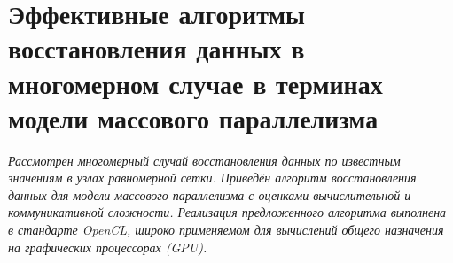 
\section*{Эффективные
  алгоритмы восстановления данных в многомерном случае
  в терминах модели массового параллелизма
}




\bigskip

\textit{
  Рассмотрен многомерный случай восстановления данных
  по известным значениям в узлах равномерной сетки. 
  Приведён алгоритм восстановления данных для модели массового параллелизма
  с оценками вычислительной и коммуникативной сложности.
  Реализация предложенного алгоритма выполнена в стандарте OpenCL,
  широко применяемом для вычислений общего назначения на графических процессорах (GPU).
}






